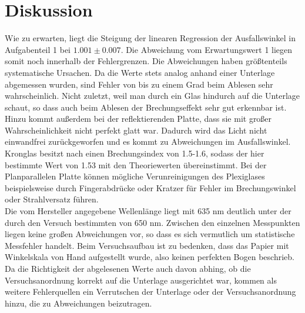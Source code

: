 \section{Diskussion}
\label{sec:Diskussion}

Wie zu erwarten, liegt die Steigung der linearen Regression der Ausfallswinkel in Aufgabenteil 1 bei 
$1.001 \pm 0.007$. Die Abweichung vom Erwartungswert 1 liegen somit noch innerhalb der Fehlergrenzen.
Die Abweichungen haben größtenteils systematische Ursachen. Da die Werte stets analog 
anhand einer Unterlage abgemessen wurden, sind Fehler von bis zu einem Grad beim Ablesen sehr wahrscheinlich.
Nicht zuletzt, weil man durch ein Glas hindurch auf die Unterlage schaut, so dass auch beim Ablesen
der Brechungseffekt sehr gut erkennbar ist. Hinzu kommt außerdem bei der reflektierenden 
Platte, dass sie mit großer Wahrscheinlichkeit nicht perfekt glatt war. Dadurch wird das 
Licht nicht einwandfrei zurückgeworfen und es kommt zu Abweichungen im Ausfallswinkel. \\
 
\noindent Kronglas besitzt nach \cite{brechind} einen Brechungsindex von 1.5-1.6, sodass der hier bestimmte Wert von 
1.53 mit den Theoriewerten übereinstimmt. Bei der Planparallelen Platte können mögliche Verunreinigungen des 
Plexiglases beispielsweise durch Fingerabdrücke oder Kratzer für Fehler im Brechungswinkel oder 
Strahlversatz führen. \\

\noindent Die vom Hersteller angegebene Wellenlänge liegt mit 635 nm deutlich unter der durch den Versuch 
bestimmten von 650 nm. Zwischen den einzelnen Messpunkten liegen keine großen Abweichungen 
vor, so dass es sich vermutlich um statistische Messfehler handelt. Beim Versuchsaufbau ist 
zu bedenken, dass das Papier mit Winkelskala von Hand aufgestellt wurde, also keinen perfekten 
Bogen beschrieb. Da die Richtigkeit der abgelesenen Werte auch davon abhing, ob die Versuchsanordnung
korrekt auf die Unterlage ausgerichtet war, kommen als weitere Fehlerquellen ein Verrutschen
der Unterlage oder der Versuchsanordnung hinzu, die zu Abweichungen beizutragen.\\
